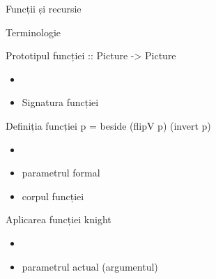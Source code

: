 \documentclass[xcolor=pdftex,romanian,colorlinks]{beamer}
\begin{document}
\begin{section}{Funcții și recursie}
\begin{frame}{Terminologie}
\begin{block}{Prototipul funcției \hfill
{} {\color{black}:: Picture -> Picture}}
\begin{itemize}
\item {}
\item Signatura funcției
\end{itemize}
\end{block}
\begin{block}{Definiția funcției \hfill {} \alert{p} {\color{black}= beside (flipV p) (invert p)}}

\begin{itemize}
\item {}
\item \alert{parametrul formal}
\item corpul funcției
\end{itemize}
\end{block}
\begin{block}{Aplicarea funcției \hfill {} \alert{knight}}
\begin{itemize}
\item {}
\item \alert{parametrul actual (argumentul)}
\end{itemize}
\end{block}
\end{frame}
\end{section}
\end{document}
